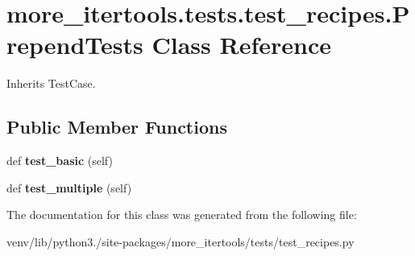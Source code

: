 \hypertarget{classmore__itertools_1_1tests_1_1test__recipes_1_1_prepend_tests}{}\section{more\+\_\+itertools.\+tests.\+test\+\_\+recipes.\+Prepend\+Tests Class Reference}
\label{classmore__itertools_1_1tests_1_1test__recipes_1_1_prepend_tests}


Inherits Test\+Case.

\subsection*{Public Member Functions}
\begin{DoxyCompactItemize}
\item 
\mbox{\label{classmore__itertools_1_1tests_1_1test__recipes_1_1_prepend_tests_ad4f9c36f558ecc351a73c8cbb6b21983}} 
def {\bfseries test\+\_\+basic} (self)
\item 
\mbox{\label{classmore__itertools_1_1tests_1_1test__recipes_1_1_prepend_tests_a340f38940fc3d73ff41d00e430a873c7}} 
def {\bfseries test\+\_\+multiple} (self)
\end{DoxyCompactItemize}


The documentation for this class was generated from the following file\+:\begin{DoxyCompactItemize}
\item 
venv/lib/python3./site-\/packages/more\+\_\+itertools/tests/test\+\_\+recipes.\+py\end{DoxyCompactItemize}
